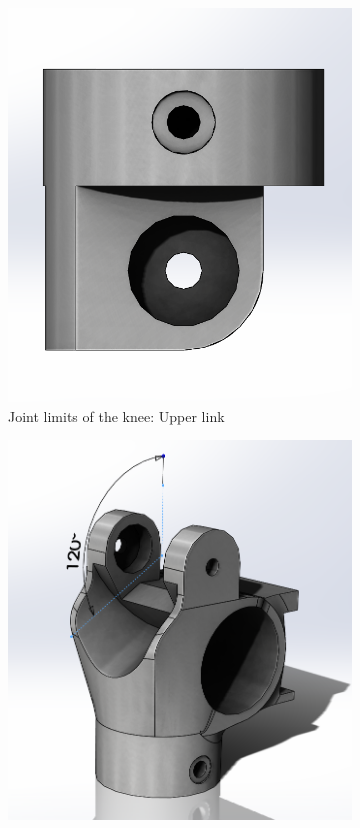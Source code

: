 \begin{figure}[ht!]
    \ContinuedFloat %
    \begin{subfigure}[b]{0.49\textwidth}
        \includegraphics[width=\textwidth]{figures/joint_limits_knee_upper.PNG}
        \caption{Joint limits of the knee: Upper link}
        \label{fig:joint_limits_knee_upper}
    \end{subfigure}
    \begin{subfigure}[b]{0.49\textwidth}
        \includegraphics[width=\textwidth]{figures/joint_limits_knee_lower.PNG}

\end{subfigure}
\end{figure}
